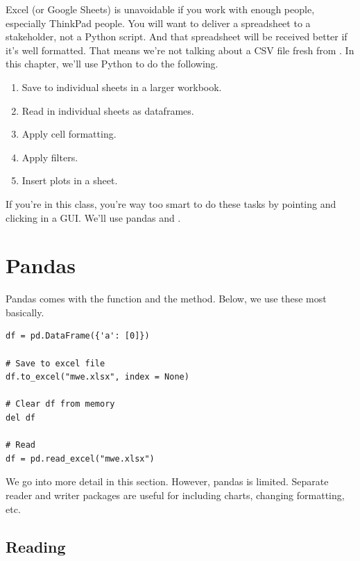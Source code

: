 \noindent {}
\smallskip

Excel (or Google Sheets) is unavoidable if you work with enough people, especially ThinkPad people. You will want to deliver a spreadsheet to a stakeholder, not a Python script. And that spreadsheet will be received better if it's well formatted. That means we're not talking about a CSV file fresh from . In this chapter, we'll use Python to do the following.

\begin{enumerate}
    \item Save to individual sheets in a larger workbook.
    \item Read in individual sheets as dataframes.
    \item Apply cell formatting.
    \item Apply filters.
    \item Insert plots in a sheet.
\end{enumerate}

\noindent If you're in this class, you're way too smart to do these tasks by pointing and clicking in a GUI. We'll use pandas and .%

\section{Pandas}

Pandas comes with the  function and the  method. Below, we use these most basically. 

\begin{lstlisting}
df = pd.DataFrame({'a': [0]})

# Save to excel file
df.to_excel("mwe.xlsx", index = None)

# Clear df from memory
del df

# Read
df = pd.read_excel("mwe.xlsx")
\end{lstlisting}

We go into more detail in this section. However, pandas is limited. Separate reader and writer packages are useful for including charts, changing formatting, etc. 

\subsection{Reading}

